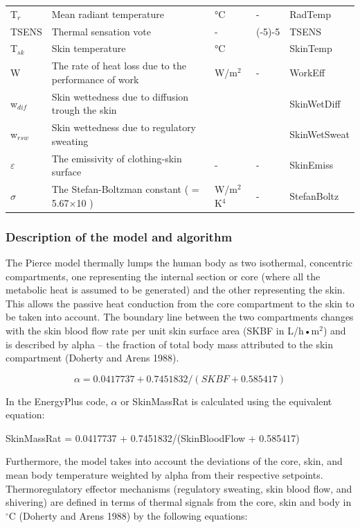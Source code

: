 \begin{longtable}[c]{p{1.2in}p{2.0in}p{0.8in}p{0.8in}p{1.2in}}
T\(_{r}\) & Mean radiant temperature & °C & - & RadTemp \tabularnewline
TSENS & Thermal sensation vote & - & (-5)-5 & TSENS \tabularnewline
T\(_{sk}\) & Skin temperature & °C & ~ & SkinTemp \tabularnewline
W & The rate of heat loss due to the performance of work & W/m\(^{2}\) & - & WorkEff \tabularnewline
w\(_{dif}\) & Skin wettedness due to diffusion trough the skin & ~ & ~ & SkinWetDiff \tabularnewline
w\(_{rsw}\) & Skin wettedness due to regulatory sweating & ~ & ~ & SkinWetSweat \tabularnewline
$\varepsilon$ & The emissivity of clothing-skin surface & - & - & SkinEmiss \tabularnewline
$\sigma$ & The Stefan-Boltzman constant ( = 5.67×10  ) & W/m\(^{2}\)K\(^{4}\) & - & StefanBoltz \tabularnewline
\bottomrule
\end{longtable}

\subsubsection{Description of the model and algorithm}\label{description-of-the-model-and-algorithm-1}

The Pierce model thermally lumps the human body as two isothermal, concentric compartments, one representing the internal section or core (where all the metabolic heat is assumed to be generated) and the other representing the skin. This allows the passive heat conduction from the core compartment to the skin to be taken into account. The boundary line between the two compartments changes with the skin blood flow rate per unit skin surface area (SKBF in L/h•m\(^{2}\)) and is described by alpha -- the fraction of total body mass attributed to the skin compartment (Doherty and Arens 1988).

\begin{equation}
\alpha  = 0.0417737 + 0.7451832/(SKBF + 0.585417)
\end{equation}

In the EnergyPlus code, \(\alpha\) or SkinMassRat is calculated using the equivalent equation:

SkinMassRat = 0.0417737 + 0.7451832/(SkinBloodFlow + 0.585417)

Furthermore, the model takes into account the deviations of the core, skin, and mean body temperature weighted by alpha from their respective setpoints. Thermoregulatory effector mechanisms (regulatory sweating, skin blood flow, and shivering) are defined in terms of thermal signals from the core, skin and body in $^{\circ}$C (Doherty and Arens 1988) by the following equations:

